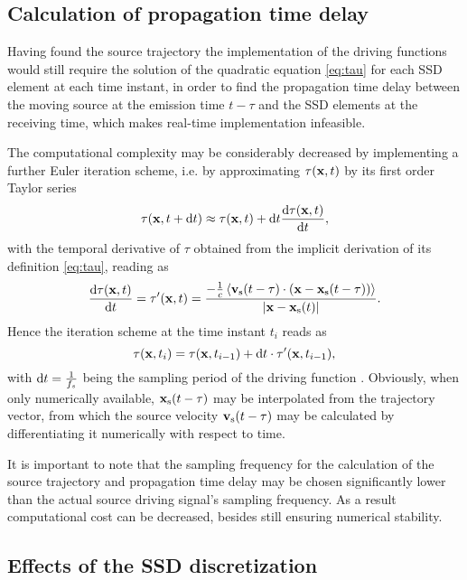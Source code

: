 \subsection{Calculation of propagation time delay}
	
Having found the source trajectory the implementation of the driving functions would still require the solution of the quadratic equation \eqref{eq:tau} for each SSD element at each time instant, in order to find the propagation time delay between the moving source at the emission time $t-\tau$ and the SSD elements at the receiving time, which makes real-time implementation infeasible.

The computational complexity may be considerably decreased by implementing a further Euler iteration scheme, i.e. by approximating $\tau(\mathbf{x},t)$ by its first order Taylor series
\begin{equation}
\tau(\mathbf{x},t+\mathrm{d} t) \approx \tau(\mathbf{x},t) + \mathrm{d} t \frac{\mathrm{d} \tau(\mathbf{x},t)}{\mathrm{d} t},
\end{equation}
with the temporal derivative of $\tau$ obtained from the implicit derivation of its definition \eqref{eq:tau}, reading as
\begin{equation}
\frac{\mathrm{d} \tau(\mathbf{x},t)}{\mathrm{d} t} = \tau'(\mathbf{x},t) = \frac{-\frac{1}{c} \left< \mathbf{v}_{\mathrm{s}}(t-\tau) \cdot ( \mathbf{x}-\mathbf{x}_{\mathrm{s}}(t-\tau) ) \right>}{| \mathbf{x} - \mathbf{x}_{\mathrm{s}}(t) |}.
\end{equation}
Hence the iteration scheme at the time instant $t_i$ reads as
\begin{equation}
\tau(\mathbf{x},t_i) = \tau(\mathbf{x},t_{i-1}) + \mathrm{d} t \cdot \tau'(\mathbf{x},t_{i-1}),
\end{equation}
with $\mathrm{d} t = \frac{1}{f_s}$ being the sampling period of the driving function \cite{doi:10.1121/1.4996126}.
Obviously, when only numerically available, $\mathbf{x}_{\mathrm{s}}(t-\tau)$ may be interpolated from the trajectory vector, from which the source velocity $\mathbf{v}_{\mathrm{s}}(t-\tau)$ may be calculated by differentiating it numerically with respect to time.

It is important to note that the sampling frequency for the calculation of the source trajectory and propagation time delay may be chosen significantly lower than the actual source driving signal's sampling frequency.
As a result computational cost can be decreased, besides still ensuring numerical stability. 

\subsection{Effects of the SSD discretization}

